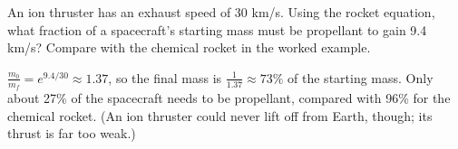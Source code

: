 \begin{Exercise}[title={Faster exhaust}, label=fl_ion]
An ion thruster has an exhaust speed of 30 km/s. Using the rocket equation,
what fraction of a spacecraft's starting mass must be propellant to gain
9.4 km/s? Compare with the chemical rocket in the worked example.
\end{Exercise}
\begin{Answer}[ref=fl_ion]
$\frac{m_0}{m_f} = e^{9.4/30} \approx 1.37$, so the final mass is
$\frac{1}{1.37} \approx 73\%$ of the starting mass. Only about 27\% of the
spacecraft needs to be propellant, compared with 96\% for the chemical
rocket. (An ion thruster could never lift off from Earth, though; its
thrust is far too weak.)
\end{Answer}
